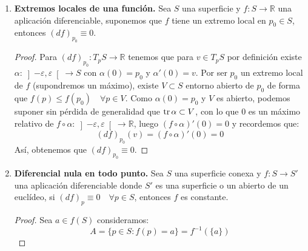 \begin{enumerate}
\begin{ejercicio}
        \noindent
        Para $\phi:S_1\to S_2$ tenemos $(d\phi)_p:T_pS_1\to T_{\phi(p)}S_2$ y para $\phi^{-1}:S_2\to S_1$ podemos considerar $(d\phi^{-1})_{\phi(p)}:T_pS_2\to T_pS_1$. Demostraremos directamente que ${(d\phi)}^{-1}_p = (d\phi^{-1})_{\phi(p)}$ usando la regla de la cadena, pues:
        \begin{align*}
            (d\phi^{-1})_{\phi(p)}\circ (d\phi)_p &= d(\phi^{-1}\circ \phi)_p = d(1_{S_1})_p = 1_{T_pS_1} \\
            (d\phi)_p\circ (d\phi^{-1})_{\phi(p)} &= d(\phi^{-1}\circ \phi)_{\phi(p)} = d(1_{S_2})_{\phi(p)} = 1_{T_pS_2}
        \end{align*}
    \end{ejercicio}

    \item \textbf{Extremos locales de una función.} Sea $S$ una superficie y $f:S\to \mathbb{R}$ una aplicación diferenciable, suponemos que $f$ tiene un extremo local en $p_0\in S$, entonces $(d f)_{p_0}\equiv 0$.
        \begin{proof}
            Para $(d f)_{p_0}:T_pS\to \mathbb{R}$ tenemos que para $v\in T_pS$ por definición existe $\alpha:\left]-\varepsilon,\varepsilon\right[\to S$ con $\alpha(0) = p_0$ y $\alpha'(0) = v$. Por ser $p_0$ un extremo local de $f$ (supondremos un máximo), existe $V\subset S$ entorno abierto de $p_0$ de forma que $f(p)\leq f(p_0)\quad \forall p\in V$. Como $\alpha(0) = p_0$ y $V$ es abierto, podemos suponer sin pérdida de generalidad que $\operatorname{tr}\alpha\subset V$, con lo que $0$ es un máximo relativo de $f\circ \alpha:\left]-\varepsilon,\varepsilon\right[\to\mathbb{R}$, luego $(f\circ \alpha)'(0) = 0$ y recordemos que:
            \begin{equation*}
                (d f)_{p_0}(v) = (f\circ \alpha)'(0) = 0
            \end{equation*}
            Así, obtenemos que $(d f)_{p_0}\equiv 0$.
        \end{proof}
    \item \textbf{Diferencial nula en todo punto.} Sea $S$ una superficie conexa y $f:S\to S'$ una aplicación diferenciable donde $S'$ es una superficie o un abierto de un euclídeo, si $(d f)_p\equiv 0\quad \forall p\in S$, entonces $f$ es constante.
        \begin{proof}
            Sea $a\in f(S)$ consideramos:
            \begin{equation*}
                A = \{p\in S : f(p) = a\} = f^{-1}(\{a\})
            \end{equation*}

\end{proof}
\end{enumerate}
